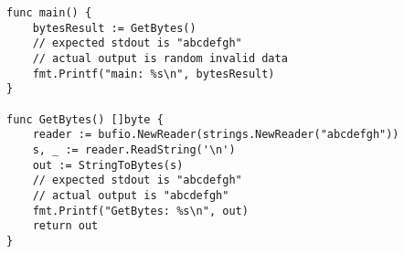 \begin{lstlisting}[float=tp, language=Golang, label=lst:escape-analysis-flaw, caption=Escape analysis flaw proof of concept]
func main() {
    bytesResult := GetBytes()
    // expected stdout is "abcdefgh"
    // actual output is random invalid data
    fmt.Printf("main: %s\n", bytesResult)
}

func GetBytes() []byte {
    reader := bufio.NewReader(strings.NewReader("abcdefgh"))
    s, _ := reader.ReadString('\n')
    out := StringToBytes(s)
    // expected stdout is "abcdefgh"
    // actual output is "abcdefgh"
    fmt.Printf("GetBytes: %s\n", out)
    return out
}
\end{lstlisting}